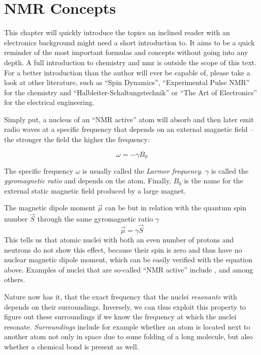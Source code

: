 \chapter{NMR Concepts}

This chapter will quickly introduce the topics an inclined reader with an electronics background might need a short introduction to. It aims to be a quick reminder of the most important formulas and concepts without going into any depth. A full introduction to chemistry and \acrshort{nmr} is outside the scope of this text. For a better introduction than the author will ever be capable of, please take a look at other literature, such as \enquote{Spin Dynamics}, \enquote{Experimental Pulse NMR} for the chemistry and \enquote{Halbleiter-Schaltungstechnik} or \enquote{The Art of Electronics} for the electrical engineering.

Simply put, a nucleus of an \enquote{NMR active} atom will absorb and then later emit radio waves at a specific frequency that depends on an external magnetic field -- the stronger the field the higher the frequency:

\[
    \omega = -\gamma{}B_0
\]

The specific frequency \(\omega\) is usually called the \emph{Larmor frequency}. \(\gamma\) is called the \emph{gyromagnetic ratio} and depends on the atom. Finally, \(B_0\) is the name for the external static magnetic field produced by a large magnet.

The magnetic dipole moment \(\vec{\mu}\) can be but in relation with the quantum spin number \(\vec{S}\) through the same gyromagnetic ratio \(\gamma\)
\[
    \vec{\mu} = \gamma\vec{S}
\]
This tells us that atomic nuclei with both an even number of protons and neutrons do not show this effect, because their spin is zero and thus have no nuclear magnetic dipole moment, which can be easily verified with the equation above. Examples of nuclei that are so-called \enquote{NMR active} include ,  and  among others.

Nature now has it, that the exact frequency that the nuclei \emph{resonante} with depends on their surroundings. Inversely, we can thus exploit this property to figure out these surroundings if we know the frequency at which the nuclei resonate. \emph{Surroundings} include for example whether an atom is located next to another atom not only in space due to some folding of a long molecule, but also whether a chemical bond is present as well.

